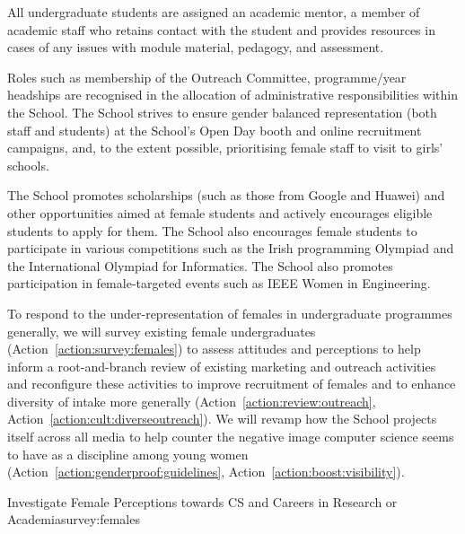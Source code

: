 

All undergraduate students are assigned an academic mentor, a member of 
academic staff who retains contact with the student and provides resources 
in cases of any issues with module material, pedagogy, and assessment.

Roles such as membership of the Outreach Committee, programme/year
headships are recognised in the allocation of administrative 
responsibilities within the School. The School strives to ensure 
gender balanced  representation (both staff and students) at the 
School's Open Day booth and online recruitment campaigns, and, to
the extent possible,  prioritising female staff to visit to girls' 
schools.

The School promotes scholarships (such as those from Google and Huawei)
and other opportunities aimed at female students and 
actively encourages eligible students to apply for them. The School 
also encourages female students to participate in various competitions 
such as the Irish programming Olympiad and the International Olympiad 
for Informatics.  The School also promotes participation in  
female-targeted events such as IEEE Women in Engineering.

To respond to the under-representation of females in
undergraduate programmes generally, we will survey
existing female undergraduates 
(Action~\ref{action:survey:females})
to assess attitudes and perceptions to help inform a
root-and-branch review of existing marketing and outreach
activities and reconfigure these activities to improve
recruitment of females and to enhance diversity of intake
more generally (Action~\ref{action:review:outreach},
Action~\ref{action:cult:diverseoutreach}).
We will revamp how the School projects
itself across all media to help counter the negative image
computer science seems to have as a discipline  among young
women (Action~\ref{action:genderproof:guidelines}, 
Action~\ref{action:boost:visibility}).


\begin{actionblock}{\ksspace{}Investigate Female Perceptions towards
CS and Careers in Research or Academia}{survey:females}
\actsurveyugfemales
\hfill{
    \hypersetup{hidelinks}
    \hyperlink{b0}{\gotoactionsymbol{}}
}
\end{actionblock}

